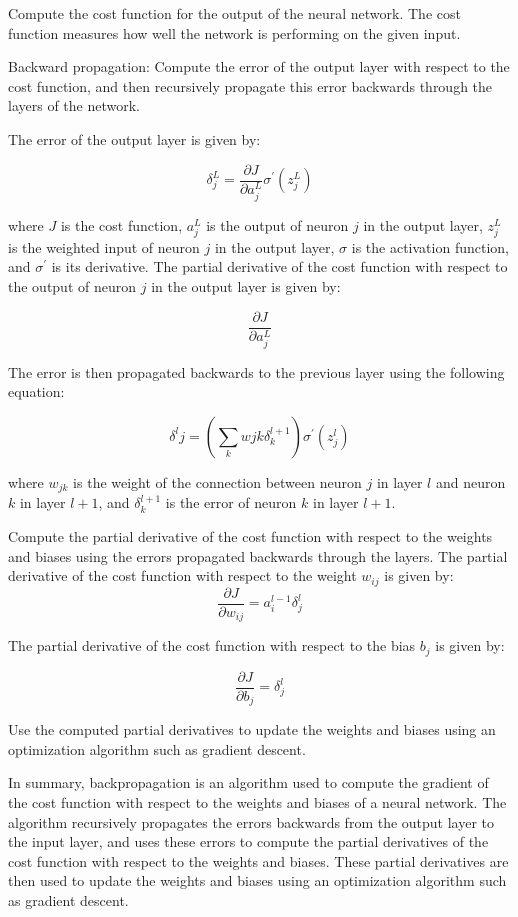 Compute the cost function for the output of the neural network. The cost function measures how well the network is performing on the given input.

Backward propagation: Compute the error of the output layer with respect to the cost function, and then recursively propagate this error backwards through the layers of the network.

The error of the output layer is given by:

\begin{equation}
\delta^{L}_j = \frac{\partial J}{\partial a^{L}_j} \sigma^{\prime}(z^{L}_j)
\end{equation}

where $J$ is the cost function, $a^{L}_j$ is the output of neuron $j$ in the output layer, $z^{L}_j$ is the weighted input of neuron $j$ in the output layer, $\sigma$ is the activation function, and $\sigma^{\prime}$ is its derivative. The partial derivative of the cost function with respect to the output of neuron $j$ in the output layer is given by:

\begin{equation}
\frac{\partial J}{\partial a^{L}_j}
\end{equation}

The error is then propagated backwards to the previous layer using the following equation:

\begin{equation}
\delta^{l}j = (\sum_k w{jk}\delta^{l+1}_k) \sigma^{\prime}(z^{l}_j)
\end{equation}

where $w_{jk}$ is the weight of the connection between neuron $j$ in layer $l$ and neuron $k$ in layer $l+1$, and $\delta^{l+1}_k$ is the error of neuron $k$ in layer $l+1$.

Compute the partial derivative of the cost function with respect to the weights and biases using the errors propagated backwards through the layers. The partial derivative of the cost function with respect to the weight $w_{ij}$ is given by:
\begin{equation}
\frac{\partial J}{\partial w_{ij}} = a^{l-1}_i \delta^{l}_j
\end{equation}

The partial derivative of the cost function with respect to the bias $b_j$ is given by:

\begin{equation}
\frac{\partial J}{\partial b_j} = \delta^{l}_j
\end{equation}

Use the computed partial derivatives to update the weights and biases using an optimization algorithm such as gradient descent.

In summary, backpropagation is an algorithm used to compute the gradient of the cost function with respect to the weights and biases of a neural network. The algorithm recursively propagates the errors backwards from the output layer to the input layer, and uses these errors to compute the partial derivatives of the cost function with respect to the weights and biases. These partial derivatives are then used to update the weights and biases using an optimization algorithm such as gradient descent.